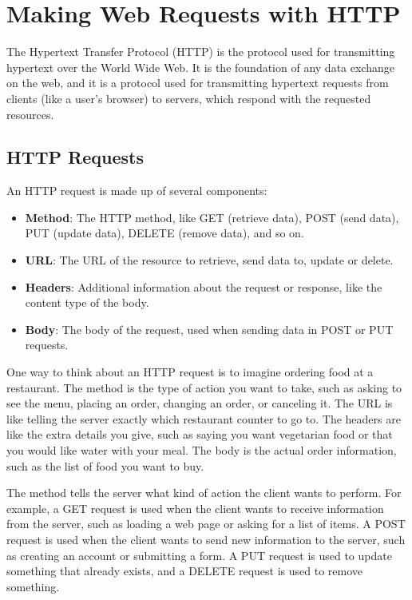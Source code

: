 \chapter{Making Web Requests with HTTP}

The Hypertext Transfer Protocol (HTTP) is the protocol used for
transmitting hypertext over the World Wide Web. It is the foundation
of any data exchange on the web, and it is a protocol used for
transmitting hypertext requests from clients (like a user's browser)
to servers, which respond with the requested resources.

\section{HTTP Requests}

An HTTP request is made up of several components:

\begin{itemize}
    \item \textbf{Method}: The HTTP method, like GET (retrieve data), POST (send data), PUT (update data), DELETE (remove data), and so on.
    \item \textbf{URL}: The URL of the resource to retrieve, send data to, update or delete.
    \item \textbf{Headers}: Additional information about the request or response, like the content type of the body.
    \item \textbf{Body}: The body of the request, used when sending data in POST or PUT requests.
\end{itemize}

One way to think about an HTTP request is to imagine ordering food at
a restaurant. The method is the type of action you want to take, such
as asking to see the menu, placing an order, changing an order, or
canceling it. The URL is like telling the server exactly which
restaurant counter to go to. The headers are like the extra details
you give, such as saying you want vegetarian food or that you would
like water with your meal. The body is the actual order information,
such as the list of food you want to buy.

The method tells the server what kind of action the client wants to
perform. For example, a GET request is used when the client wants to
receive information from the server, such as loading a web page or
asking for a list of items. A POST request is used when the client
wants to send new information to the server, such as creating an
account or submitting a form. A PUT request is used to update
something that already exists, and a DELETE request is used to remove
something.

